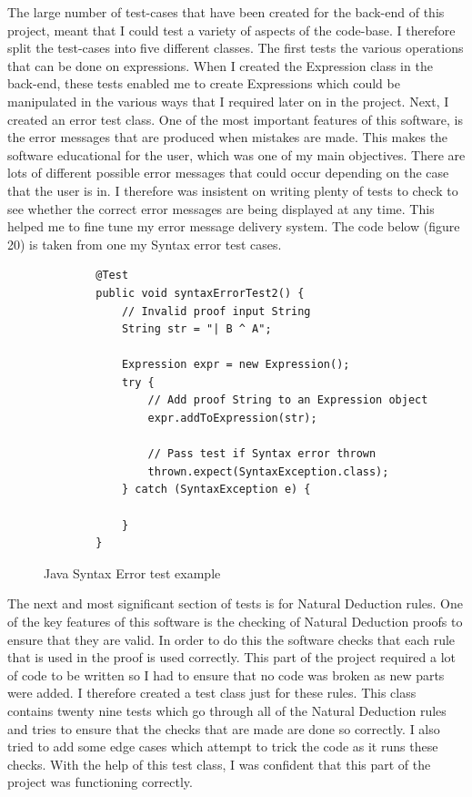 The large number of test-cases that have been created for the back-end of this project, meant that I could test a variety of aspects of the code-base. I therefore split the test-cases into five different classes. The first tests the various operations that can be done on expressions. When I created the Expression class in the back-end, these tests enabled me to create Expressions which could be manipulated in the various ways that I required later on in the project. Next, I created an error test class. One of the most important features of this software, is the error messages that are produced when mistakes are made. This makes the software educational for the user, which was one of my main objectives. There are lots of different possible error messages that could occur depending on the case that the user is in. I therefore was insistent on writing plenty of tests to check to see whether the correct error messages are being displayed at any time. This helped me to fine tune my error message delivery system. The code below (figure 20) is taken from one my Syntax error test cases.

\begin{figure}[!ht]

	\begin{lstlisting}
		@Test
		public void syntaxErrorTest2() {
			// Invalid proof input String
			String str = "| B ^ A";
	
			Expression expr = new Expression();
			try {
				// Add proof String to an Expression object
				expr.addToExpression(str);
				
				// Pass test if Syntax error thrown
				thrown.expect(SyntaxException.class);
			} catch (SyntaxException e) {
	
			}
		}
	\end{lstlisting}
\caption{Java Syntax Error test example }
\end{figure}

The next and most significant section of tests is for Natural Deduction rules. One of the key features of this software is the checking of Natural Deduction proofs to ensure that they are valid. In order to do this the software checks that each rule that is used in the proof is used correctly. This part of the project required a lot of code to be written so I had to ensure that no code was broken as new parts were added. I therefore created a test class just for these rules. This class contains twenty nine tests which go through all of the Natural Deduction rules and tries to ensure that the checks that are made are done so correctly. I also tried to add some edge cases which attempt to trick the code as it runs these checks. With the help of this test class, I was confident that this part of the project was functioning correctly.

